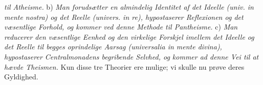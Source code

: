 \documentclass[12pt]{book}
\begin{document}
%
\emph{til Atheisme.} b) \emph{Man forudsætter en almindelig Identitet af det Ideelle
\textit{(univ. in mente nostra)} og det Reelle \textit{(univers. in re)}, hypostaserer
Reflexionen og det væsentlige Forhold, og kommer ved denne Methode til Pantheisme.}
c) \emph{Man reducerer den væsentlige Eenhed og den virkelige Forskjel imellem det Ideelle
og det Reelle til begges oprindelige Aarsag \textit{(universalia in mente divina)},
hypostaserer Centralmonadens begribende Selvhed, og kommer ad denne Vei til at hævde
Theismen.} Kun disse tre Theorier ere mulige; vi skulle nu prøve deres Gyldighed.
\end{document}
